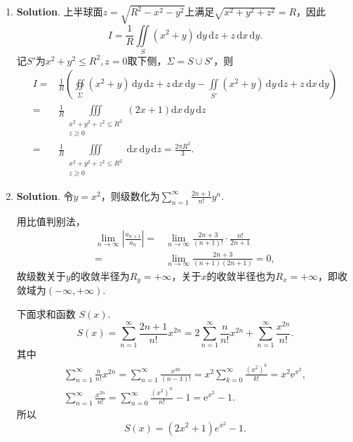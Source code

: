 \documentclass[../main.tex]{subfiles}
\begin{document}
\begin{enumerate}
  \item \textbf{Solution}. 上半球面$z=\sqrt{R^2-x^2-y^2}$上满足$\sqrt{x^2+y^2+z^2}=R$，因此
        \[
          I=\frac{1}{R}\iint\limits_S \left(x^2+y\right)\,\mathrm{d}y\,\mathrm{d}z+z\,\mathrm{d}x\,\mathrm{d}y.
        \]
        记$S'$为$x^2+y^2\leq R^2,z=0$取下侧，$\Sigma = S\cup S'$，则
        \[
          \begin{aligned}
            I= {} & \frac{1}{R}\left(\oiint\limits_{\Sigma}\left(x^2+y\right)\,\mathrm{d}y\,\mathrm{d}z+z\,\mathrm{d}x\,\mathrm{d}y-\iint\limits_{S'}\left(x^2+y\right)\,\mathrm{d}y\,\mathrm{d}z+z\,\mathrm{d}x\,\mathrm{d}y\right) \\
            = {}  & \frac{1}{R}\iiint\limits_{\substack{x^2+y^2+z^2\leq R^2\\z\geq0}}(2x+1) \mathrm{d}x\,\mathrm{d}y\,\mathrm{d}z                                                                                                    \\
            = {}  & \frac{1}{R}\iiint\limits_{\substack{x^2+y^2+z^2\leq R^2\\z\geq0}}\mathrm{d}x\,\mathrm{d}y\,\mathrm{d}z = \frac{2\pi R^2}{3}.
          \end{aligned}
        \]

  \item \textbf{Solution}. 令$y=x^2$，则级数化为$\sum_{n=1}^{\infty}\frac{2n+1}{n!}y^n$.

        用比值判别法，
        \[
          \begin{aligned}
            \lim_{n\to\infty}\left|\frac{a_{n+1}}{a_n}\right|= {} & \lim_{n\to\infty}\frac{2n+3}{(n+1)!}\cdot\frac{n!}{2n+1} \\
            = {}                                                  & \lim_{n\to\infty}\frac{2n+3}{(n+1)(2n+1)}=0,
          \end{aligned}
        \]
        故级数关于$y$的收敛半径为$R_{y}=+\infty$，关于$x$的收敛半径也为$R_x=+\infty$，即收敛域为$(-\infty,+\infty)$.

        下面求和函数 $S(x)$.
        \[
          S(x)=\sum_{n=1}^{\infty}\frac{2n+1}{n!}x^{2n}
          =2\sum_{n=1}^{\infty}\frac{n}{n!}x^{2n}+\sum_{n=1}^{\infty}\frac{x^{2n}}{n!}.
        \]
        其中
        \[
          \begin{gathered}
            \sum_{n=1}^{\infty}\frac{n}{n!}x^{2n}=\sum_{n=1}^{\infty}\frac{x^{2n}}{(n-1)!}=x^2\sum_{k=0}^{\infty}\frac{\left(x^{2}\right)^{k}}{k!}=x^2\mathrm{e}^{x^2},\\
            \sum_{n=1}^{\infty}\frac{x^{2n}}{n!}=\sum_{n=0}^{\infty}\frac{\left(x^{2}\right)^{n}}{n!}-1=\mathrm{e}^{x^2}-1.
          \end{gathered}
        \]
        所以
        \[
          S(x)=(2x^2+1)e^{x^2}-1.
        \]

\end{enumerate}
\end{document}

